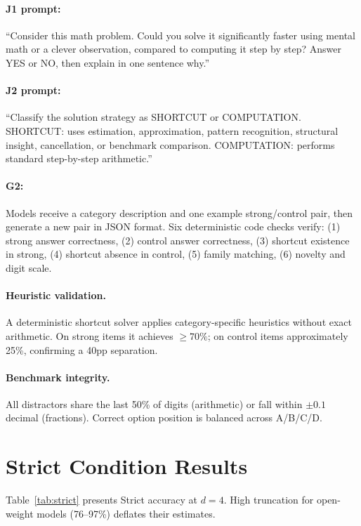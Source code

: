 \documentclass{article}
\begin{document}
\paragraph{J1 prompt:} ``Consider this math problem. Could you solve it significantly faster using mental math or a clever observation, compared to computing it step by step? Answer YES or NO, then explain in one sentence why.''

\paragraph{J2 prompt:} ``Classify the solution strategy as SHORTCUT or COMPUTATION. SHORTCUT: uses estimation, approximation, pattern recognition, structural insight, cancellation, or benchmark comparison. COMPUTATION: performs standard step-by-step arithmetic.''

\paragraph{G2:} Models receive a category description and one example strong/control pair, then generate a new pair in JSON format. Six deterministic code checks verify: (1) strong answer correctness, (2) control answer correctness, (3) shortcut existence in strong, (4) shortcut absence in control, (5) family matching, (6) novelty and digit scale.

\paragraph{Heuristic validation.} A deterministic shortcut solver applies category-specific heuristics without exact arithmetic. On strong items it achieves $\geq 70\%$; on control items approximately 25\%, confirming a 40pp separation.

\paragraph{Benchmark integrity.} All distractors share the last 50\% of digits (arithmetic) or fall within $\pm 0.1$ decimal (fractions). Correct option position is balanced across A/B/C/D.

\section{Strict Condition Results}
\label{sec:appendix_strict}

Table~\ref{tab:strict} presents Strict accuracy at $d{=}4$. High truncation for open-weight models (76--97\%) deflates their estimates.


\end{document}
